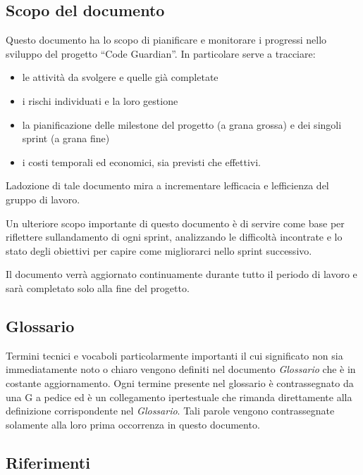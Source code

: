 \documentclass[12pt, a4paper]{article}
\begin{document}
\subsection{Scopo del documento}

Questo documento ha lo scopo di pianificare e monitorare i progressi nello sviluppo del progetto ``Code Guardian''. In particolare serve a tracciare:

\begin{itemize}
\item
  le attività da svolgere e quelle già completate
\item
  i rischi individuati e la loro gestione
\item
  la pianificazione delle milestone del progetto (a grana grossa) e dei
  singoli sprint (a grana fine)
\item
  i costi temporali ed economici, sia previsti che effettivi.
\end{itemize}

L\textquotesingle adozione di tale documento mira a incrementare
l\textquotesingle efficacia e l\textquotesingle efficienza del gruppo di
lavoro.

Un ulteriore scopo importante di questo documento è di servire come base
per riflettere sull\textquotesingle andamento di ogni sprint,
analizzando le difficoltà incontrate e lo stato degli obiettivi per
capire come migliorarci nello sprint successivo.

Il documento verrà aggiornato continuamente durante tutto il periodo di
lavoro e sarà completato solo alla fine del progetto.

\subsection{Glossario}

Termini tecnici e vocaboli particolarmente importanti il cui
significato non sia immediatamente noto o chiaro vengono definiti nel
documento \emph{Glossario} che è in costante aggiornamento. Ogni termine
presente nel glossario è contrassegnato da una G a pedice ed è un
collegamento ipertestuale che rimanda direttamente alla definizione
corrispondente nel \emph{Glossario}. Tali parole vengono contrassegnate
solamente alla loro prima occorrenza in questo documento.

\subsection{Riferimenti}
\end{document}
